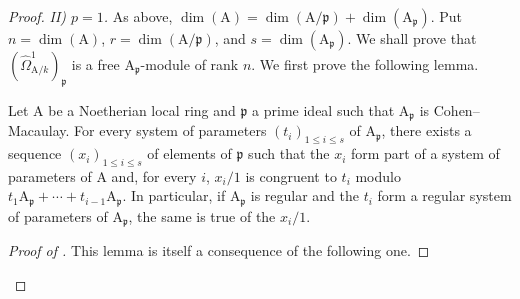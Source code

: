 \begin{proof}
\emph{II) $p=1$.} As above, $\dim(\mathrm{A})=\dim(\mathrm{A}/\mathfrak{p})+\dim(\mathrm{A}_{\mathfrak{p}})$. Put $n=\dim(\mathrm{A})$, $r=\dim(\mathrm{A}/\mathfrak{p})$, and $s=\dim(\mathrm{A}_{\mathfrak{p}})$. We shall prove that $(\hat{\Omega}^1_{\mathrm{A}/k})_{\mathfrak{p}}$ is a free $\mathrm{A}_{\mathfrak{p}}$-module of rank $n$. We first prove the following lemma.

\begin{lemma}[18.11.3.3]
\label{IV.18.11.3.3}
Let $\mathrm{A}$ be a Noetherian local ring and $\mathfrak{p}$ a prime ideal such that $\mathrm{A}_{\mathfrak{p}}$ is Cohen--Macaulay. For every system of parameters $(t_i)_{1\leq i\leq s}$ of $\mathrm{A}_{\mathfrak{p}}$, there exists a sequence $(x_i)_{1\leq i\leq s}$ of elements of $\mathfrak{p}$ such that the $x_i$ form part of a system of parameters of $\mathrm{A}$
and, for every $i$, $x_i/1$ is congruent to $t_i$ modulo $t_1\mathrm{A}_{\mathfrak{p}}+\cdots+t_{i-1}\mathrm{A}_{\mathfrak{p}}$. In particular, if $\mathrm{A}_{\mathfrak{p}}$ is regular and the $t_i$ form a regular system of parameters of $\mathrm{A}_{\mathfrak{p}}$, the same is true of the $x_i/1$.
\end{lemma}

\begin{proof}[Proof of ]
This lemma is itself a consequence of the following one.


\end{proof}
\end{proof}
